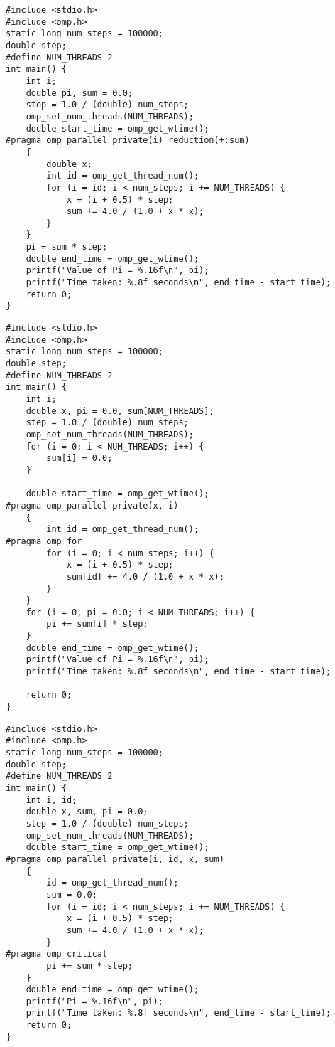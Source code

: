 \documentclass{article}
\begin{document}
\begin{lstlisting}[style=cstyle,caption={并行$\pi$值计算1}]
#include <stdio.h>
#include <omp.h>
static long num_steps = 100000;
double step;
#define NUM_THREADS 2
int main() {
    int i;
    double pi, sum = 0.0;
    step = 1.0 / (double) num_steps;
    omp_set_num_threads(NUM_THREADS);
    double start_time = omp_get_wtime();
#pragma omp parallel private(i) reduction(+:sum)
    {
        double x;
        int id = omp_get_thread_num();
        for (i = id; i < num_steps; i += NUM_THREADS) {
            x = (i + 0.5) * step;
            sum += 4.0 / (1.0 + x * x);
        }
    }
    pi = sum * step;
    double end_time = omp_get_wtime();
    printf("Value of Pi = %.16f\n", pi);
    printf("Time taken: %.8f seconds\n", end_time - start_time);
    return 0;
} 
\end{lstlisting}
\begin{lstlisting}[style=cstyle,caption={并行$\pi$值计算2}]
#include <stdio.h>
#include <omp.h>
static long num_steps = 100000;
double step;
#define NUM_THREADS 2
int main() {
    int i;
    double x, pi = 0.0, sum[NUM_THREADS];
    step = 1.0 / (double) num_steps;
    omp_set_num_threads(NUM_THREADS);
    for (i = 0; i < NUM_THREADS; i++) {
        sum[i] = 0.0;
    }

    double start_time = omp_get_wtime();
#pragma omp parallel private(x, i)
    {
        int id = omp_get_thread_num();
#pragma omp for
        for (i = 0; i < num_steps; i++) {
            x = (i + 0.5) * step;
            sum[id] += 4.0 / (1.0 + x * x);
        }
    }
    for (i = 0, pi = 0.0; i < NUM_THREADS; i++) {
        pi += sum[i] * step;
    }
    double end_time = omp_get_wtime();
    printf("Value of Pi = %.16f\n", pi);
    printf("Time taken: %.8f seconds\n", end_time - start_time);

    return 0;
}    
\end{lstlisting}
\begin{lstlisting}[style=cstyle,caption={并行$\pi$值计算3}]
#include <stdio.h>
#include <omp.h>
static long num_steps = 100000;
double step;
#define NUM_THREADS 2
int main() {
    int i, id;
    double x, sum, pi = 0.0;
    step = 1.0 / (double) num_steps;
    omp_set_num_threads(NUM_THREADS);
    double start_time = omp_get_wtime();
#pragma omp parallel private(i, id, x, sum)
    {
        id = omp_get_thread_num();
        sum = 0.0;
        for (i = id; i < num_steps; i += NUM_THREADS) {
            x = (i + 0.5) * step;
            sum += 4.0 / (1.0 + x * x);
        }
#pragma omp critical
        pi += sum * step;
    }
    double end_time = omp_get_wtime();
    printf("Pi = %.16f\n", pi);
    printf("Time taken: %.8f seconds\n", end_time - start_time);
    return 0;
}
\end{lstlisting}
\end{document}

